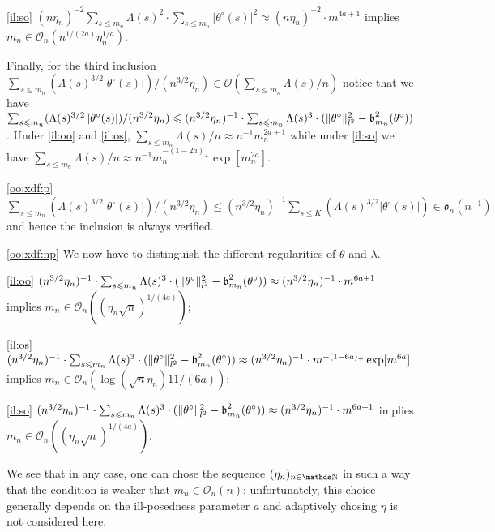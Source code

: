 \begin{il}
\begin{Liste}[]
\begin{Liste}[]
\item[\ref{il:so}] $(n \eta_{n})^{-2} \sum\limits_{s \leq m_{n}} \Lambda(s)^{2} \cdot \sum\limits_{s \leq m_{n}} \vert\theta^{\circ}(s)\vert^{2} \approx (n \eta_{n})^{-2} \cdot m^{4a + 1}$ implies $m_{n} \in \mathcal{O}_{n}(n^{1/(2a)} \eta_{n}^{1/a})$.
\end{Liste}
\end{Liste}
Finally, for the third inclusion $\sum\nolimits_{ s \leq m_{n}} (\Lambda(s)^{3/2} \left\vert\theta^{\circ}(s)\right\vert)/(n^{3/2} \eta_{n}) \in \mathcal{O}\left(\sum\nolimits_{ s \leq m_{n}} \Lambda(s)/n\right)$ notice that we have $\sum\nolimits_{ s \leqslant m_{n}} (\Lambda(s)^{3/2} \left\vert\theta^{\circ}(s)\right\vert)/(n^{3/2} \eta_{n}) \leqslant (n^{3/2} \eta_{n})^{-1} \cdot \sum\nolimits_{ s \leqslant m_{n}} \Lambda(s)^{3} \cdot (\Vert \theta^{\circ} \Vert_{l^{2}}^{2} - \operatorname{\mathfrak{b}}_{m_{n}}^{2}(\theta^{\circ}))$.
Under \ref{il:oo} and \ref{il:os}, $\sum\nolimits_{s \leq m_{n}} \Lambda(s)/n \approx n^{-1} m_{n}^{2 a + 1}$ while under \ref{il:so} we have $\sum\nolimits_{s \leq m_{n}} \Lambda(s)/n \approx n^{-1} m_{n}^{-(1 -2a)_{+}} \exp[m_{n}^{2a}]$.
\begin{Liste}[]
\item[\ref{oo:xdf:p}] $\sum\nolimits_{ s \leq m_{n}} (\Lambda(s)^{3/2} \left\vert\theta^{\circ}(s)\right\vert)/(n^{3/2} \eta_{n}) \leq (n^{3/2} \eta_{n})^{-1}\sum\nolimits_{ s \leq K} (\Lambda(s)^{3/2} \left\vert\theta^{\circ}(s)\right\vert) \in \mathfrak{o}_{n}(n^{-1})$ and hence the inclusion is always verified.
\item[\ref{oo:xdf:np}] We now have to distinguish the different regularities of $\theta$ and $\lambda$.
\begin{Liste}[]
\item[\ref{il:oo}] $(n^{3/2} \eta_{n})^{-1} \cdot \sum\nolimits_{ s \leqslant m_{n}} \Lambda(s)^{3} \cdot (\Vert \theta^{\circ} \Vert_{l^{2}}^{2} - \operatorname{\mathfrak{b}}_{m_{n}}^{2}(\theta^{\circ})) \approx (n^{3/2} \eta_{n})^{-1} \cdot m^{6 a + 1}$ implies $m_{n} \in \mathcal{O}_{n}((\eta_{n} \sqrt{n})^{1/(4a)})$;
\item[\ref{il:os}] $(n^{3/2} \eta_{n})^{-1} \cdot \sum\nolimits_{ s \leqslant m_{n}} \Lambda(s)^{3} \cdot (\Vert \theta^{\circ} \Vert_{l^{2}}^{2} - \operatorname{\mathfrak{b}}_{m_{n}}^{2}(\theta^{\circ})) \approx (n^{3/2} \eta_{n})^{-1} \cdot m^{-(1 - 6a)_{+}} \exp[m^{6a}]$ implies $m_{n} \in \mathcal{O}_{n}(\log(\sqrt{n} \eta_{n})1{1/(6a)})$;
\item[\ref{il:so}] $(n^{3/2} \eta_{n})^{-1} \cdot \sum\nolimits_{ s \leqslant m_{n}} \Lambda(s)^{3} \cdot (\Vert \theta^{\circ} \Vert_{l^{2}}^{2} - \operatorname{\mathfrak{b}}_{m_{n}}^{2}(\theta^{\circ})) \approx (n^{3/2} \eta_{n})^{-1} \cdot m^{6 a + 1}$ implies $m_{n} \in \mathcal{O}_{n}((\eta_{n} \sqrt{n})^{1/(4a)})$.
\end{Liste}
\end{Liste}
\ilEnd
\end{il}
We see that in any case, one can chose the sequence $(\eta_{n})_{n \in \N}$ in such a way that the condition is weaker that $m_{n} \in \mathcal{O}_{n}(n)$; unfortunately, this choice generally depends on the ill-posedness parameter $a$ and adaptively chosing $\eta$ is not considered here.

